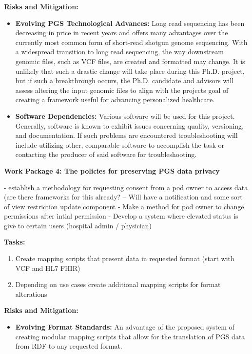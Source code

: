 \documentclass[11pt]{article}
\begin{document}
\textbf{Risks and Mitigation:} 
\begin{itemize}
	\item \textbf{Evolving PGS Technological Advances:} 
	Long read sequencing has been decreasing in price in recent years and offers many advantages over the currently most common form of short-read shotgun genome sequencing. 
	With a widespread transition to long read sequencing, the way downstream genomic files, such as VCF files, are created and formatted may change. 
	It is unlikely that such a drastic change will take place during this Ph.D. project, but if such a breakthrough occurs, the Ph.D. candidate and advisors will assess altering the input genomic files to align with the project\textquotesingle s goal of creating a framework useful for advancing personalized healthcare.
	\item \textbf{Software Dependencies:} Various software will be used for this project. Generally, software is known to exhibit issues concerning quality, versioning, and documentation. 
	If such problems are encountered troubleshooting will include utilizing other, comparable software to accomplish the task or contacting the producer of said software for troubleshooting.
\end{itemize}


\textbf{Work Package 4: The policies for preserving PGS data privacy}

- establish a methodology for requesting consent from a pod owner to access data (are there frameworks for this already?
	-- Will have a notification and some sort of view restriction update component
- Make a method for pod owner to change permissions after intial permission
- Develop a system where elevated status is give to certain users (hospital admin / physician)

\textbf{Tasks:} 
\begin{enumerate}
	\item Create mapping scripts that present data in requested format (start with VCF and HL7 FHIR)
	\item Depending on use cases create additional mapping scripts for format alterations
\end{enumerate}

\textbf{Risks and Mitigation:} 
\begin{itemize}
	\item \textbf{Evolving Format Standards:} An advantage of the proposed system of creating modular mapping scripts that allow for the translation of PGS data from RDF to any requested format. 
\end{itemize}
\end{document}

